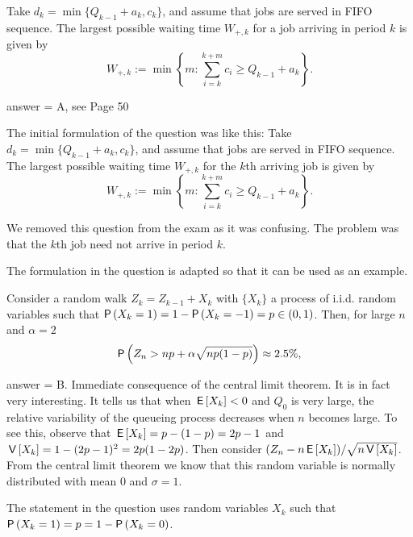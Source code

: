 \begin{exercise}[201902]
Take  $d_k = \min\{Q_{k-1}+a_k, c_k\}$, and assume that jobs are served in
  FIFO sequence. The  largest possible waiting time $W_{+, k}$ for a  job arriving in period $k$ is given by 
    \begin{equation*}
      W_{+,k}:= \min\left\{m: \sum_{i=k}^{k+m} c_i \geq
        Q_{k-1}+a_k\right\}.
    \end{equation*}

\begin{solution}
answer = A, see Page 50



The initial formulation of the question was like this: Take  $d_k = \min\{Q_{k-1}+a_k, c_k\}$, and assume that jobs are served in
  FIFO sequence. The  largest possible waiting time $W_{+, k}$ for the $k$th arriving job is given by 
    \begin{equation*}
      W_{+,k}:= \min\left\{m: \sum_{i=k}^{k+m} c_i \geq
        Q_{k-1}+a_k\right\}.
    \end{equation*}

    We  removed this question from the exam as it  was confusing. The problem was that the $k$th job need not arrive in period $k$.

    The formulation in the question is adapted so that it can be used as an example. 

\end{solution}
\end{exercise}

\begin{exercise}[201902]
  Consider a random walk $Z_k = Z_{k-1} + X_k$ with $\{X_k\}$ a process of i.i.d. random variables such that $\P{X_k=1} = 1-\P{X_k=-1} = p \in (0, 1)$. Then, for large $n$ and $\alpha = 2$
  \begin{equation*}
    \P{Z_n >  np + \alpha \sqrt{np(1-p)}} \approx 2.5\%, 
  \end{equation*}


\begin{solution}
answer = B. Immediate consequence of the central limit theorem. It is in fact very interesting. It tells us that when $\,\mathsf{E}\left[X_k\right] < 0$ and $Q_0$ is very large, the relative variability of the queueing process decreases  when $n$ becomes large. To see this, observe that $\,\mathsf{E}\left[X_k\right] = p - (1-p)=2p-1$ and $\,\mathsf{V}\left[X_k\right] = 1 - (2p-1)^2 = 2p(1-2p)$. Then consider $(Z_n - n\,\mathsf{E}\left[X_k\right])/\sqrt{n\,\mathsf{V}\left[X_k\right]}$. From the central limit theorem we know that this random variable is normally distributed with mean 0 and $\sigma=1$. 

The statement in the question uses random variables $X_k$ such that $\P{X_k=1}=p = 1- \P{X_k=0}$. 
\end{solution}
\end{exercise}

